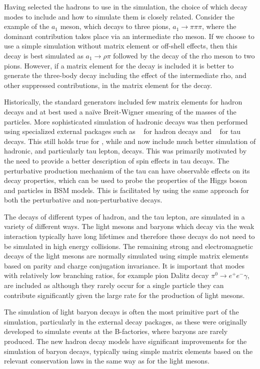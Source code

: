  Having selected the hadrons to use in the simulation, the choice of which decay modes
 to include and how to simulate them is closely related. Consider the example
 of the $a_1$ meson, which decays to three pions, $a_1\to\pi\pi\pi$, where
 the dominant contribution takes place via an intermediate rho meson. If
 we choose
 to use a simple simulation without matrix element or off-shell effects, then
 this decay is best simulated as $a_1\to\rho\pi$ followed by the decay of the
 rho meson to two pions. However, if a matrix
 element for the decay is included it is better to generate the three-body
 decay including
 the effect of the intermediate rho, and other suppressed contributions,
 in the matrix element for the decay.

 Historically, the standard generators included few matrix elements for
 hadron decays and at best used a na\"ive Breit-Wigner smearing of the masses
 of the particles. More sophisticated simulation of hadronic decays
 was then performed using specialized external packages such as
 \evtgen~\cite{Lange:2001uf} for hadron decays and
 \tauola~\cite{Golonka:2003xt,Jadach:1993hs,Jadach:1990mz} for tau decays.
 This still holds true for \pythiaeight, while \herwigpp and \sherpa
 now include much better
 simulation of hadronic, and particularly tau lepton, decays. This was primarily
 motivated by the need to provide a better description of spin effects in tau decays.
 The perturbative production mechanism of the tau can have observable
 effects on its decay properties, which can be used to probe the properties of
 the Higgs boson and particles in BSM models. This is facilitated by using
 the same approach for both the perturbative and non-perturbative
 decays.

  The decays of different types of hadron, and the tau lepton, are simulated
  in a variety of different ways.
  The light mesons and baryons which decay via the weak
  interaction typically have long lifetimes and therefore these decays do not
  need to be simulated in high energy collisions.
  The remaining strong and electromagnetic decays of the
  light mesons are normally simulated using simple matrix elements based
  on parity and charge conjugation invariance.  
  It is important that modes with relatively low branching
  ratios, for example pion Dalitz decay $\pi^0\to e^+e^-\gamma$, are included
  as although they rarely occur for a single particle they can
  contribute significantly
  given the large rate for the production of light mesons.

  The simulation of light baryon decays is often the most primitive part of the simulation,
  particularly in the external decay packages, as these were originally developed
  to simulate events at the B-factories, where baryons are rarely produced. 
  The new hadron decay models  have
  significant improvements for the simulation of baryon decays, typically using
  simple matrix elements based on the relevant conservation laws in the same way as for
  the light mesons.


